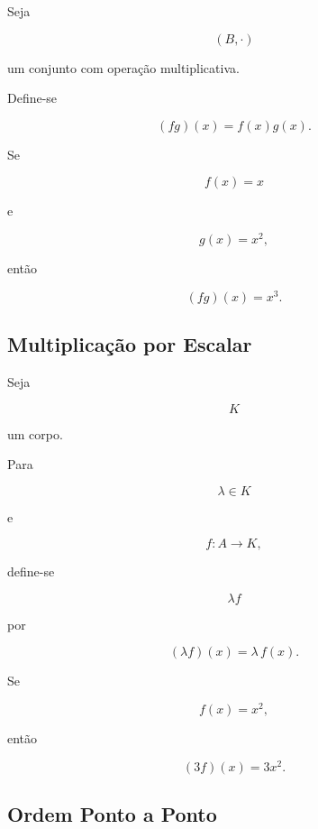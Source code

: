 \documentclass[../../main]{subfiles}
\begin{document}
\begin{defn}[Produto]
	\label{def:matematica:funcoes:operacoes:produto}

	Seja

	\[
		(B,\cdot)
	\]

	um conjunto com operação multiplicativa.

	Define-se

	\[
		(fg)(x)
		=
		f(x)g(x).
	\]

\end{defn}

\begin{ex}

	Se

	\[
		f(x)=x
	\]

	e

	\[
		g(x)=x^2,
	\]

	então

	\[
		(fg)(x)
		=
		x^3.
	\]

\end{ex}

\subsection{Multiplicação por Escalar}

\begin{defn}
	\label{def:matematica:funcoes:operacoes:escalar}

	Seja

	\[
		K
	\]

	um corpo.

	Para

	\[
		\lambda\in K
	\]

	e

	\[
		f:A\to K,
	\]

	define-se

	\[
		\lambda f
	\]

	por

	\[
		(\lambda f)(x)
		=
		\lambda\,f(x).
	\]

\end{defn}

\begin{ex}

	Se

	\[
		f(x)=x^2,
	\]

	então

	\[
		(3f)(x)
		=
		3x^2.
	\]

\end{ex}

\subsection{Ordem Ponto a Ponto}
\end{document}
